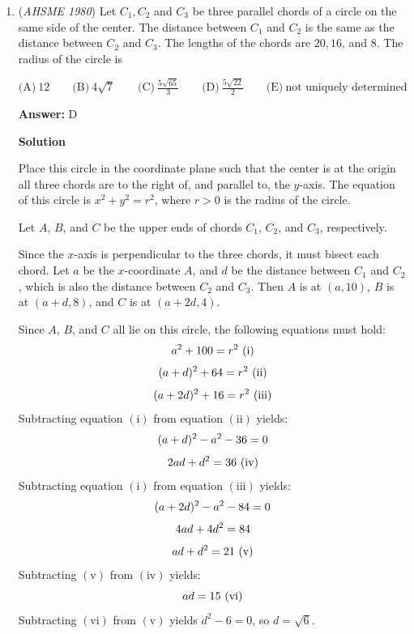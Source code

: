 \begin{enumerate}
 -aopspandy

 


	\item (\textit{AHSME 1980}) Let $C_1, C_2$ and $C_3$ be three parallel chords of a circle on the same side of the center. 
The distance between $C_1$ and $C_2$ is the same as the distance between $C_2$ and $C_3$. 
The lengths of the chords are $20, 16$, and $8$. The radius of the circle is 


 $\text{(A)} \ 12 \qquad  \text{(B)} \ 4\sqrt{7} \qquad  \text{(C)} \ \frac{5\sqrt{65}}{3} \qquad  \text{(D)}\ \frac{5\sqrt{22}}{2}\qquad \text{(E)}\ \text{not uniquely determined}$

 \textbf{Answer: }D



\textbf{Solution}

Place this circle in the coordinate plane such that the center is at the origin all three chords are to the right of, and parallel to, the $y$-axis.  The equation of this circle is $x^2 + y^2 = r^2$, where $r > 0$ is the radius of the circle. 

 Let $A$, $B$, and $C$ be the upper ends of chords $C_1$, $C_2$, and $C_3$, respectively.

 Since the $x$-axis is perpendicular to the three chords, it must bisect each chord.  Let $a$ be the $x$-coordinate $A$, and $d$ be the distance between $C_1$ and $C_2$, which is also the distance between $C_2$ and $C_3$.  Then $A$ is at $(a, 10)$, $B$ is at $(a+d, 8)$, and $C$ is at $(a+2d, 4)$.

 Since $A$, $B$, and $C$ all lie on this circle, the following equations must hold:
 \[\\a^2 + 100 = r^2\ (\textrm{i})\] 
 \[\\(a+d)^2 + 64 = r^2\ (\textrm{ii})\] 
 \[\\(a+2d)^2 + 16 = r^2\ (\textrm{iii})\]Subtracting equation $(\textrm{i})$ from equation $(\textrm{ii})$ yields:
 \[\\(a+d)^2 - a^2 - 36 = 0\]
 \[\\2ad + d^2 = 36\ (\textrm{iv})\]Subtracting equation $(\textrm{i})$ from equation $(\textrm{iii})$ yields:
 \[\\(a+2d)^2 - a^2 - 84 = 0\]
 \[\\4ad + 4d^2 = 84\]
 \[\\ad + d^2 = 21\ (\textrm{v})\]Subtracting $(\textrm{v})$ from $(\textrm{iv})$ yields:
 \[\\ad = 15\ (\textrm{vi})\]Subtracting $(\textrm{vi})$ from $(\textrm{v})$ yields $d^2 - 6 = 0$, so $d = \sqrt{6}$.


\end{enumerate}
